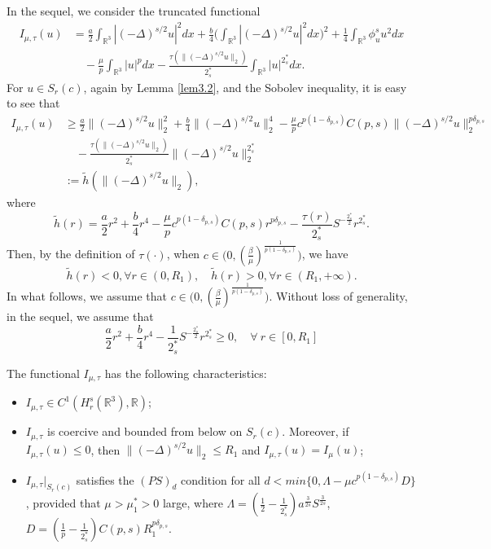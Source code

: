 In the sequel, we consider the truncated functional
\begin{equation}
\begin{split}
I_{\mu,\tau}(u)
&= \frac{a}{2}\int_{\mathbb{R}^3}|(-\Delta)^{s/2}u|^2dx+\frac{b}{4}
 \Big(\int_{\mathbb{R}^3}|(-\Delta)^{s/2}u|^2dx\Big)^2
 +\frac{1}{4}\int_{\mathbb{R}^3}\phi^s_u u^2dx\\
&\quad -\frac{\mu}{p}\int_{\mathbb{R}^3}|u|^pdx
 -\frac{\tau(\|(-\Delta)^{s/2}u\|_2)}{2^*_s}\int_{\mathbb{R}^3}|u|^{2^*_s}dx.
\end{split}
\end{equation}
For $u\in S_{r}(c)$, again by Lemma \ref{lem3.2}, and the Sobolev inequality,
it is easy to see that
\begin{align*}
I_{\mu,\tau}(u)
&\geq  \frac{a}{2}\|(-\Delta)^{s/2}u\|^2_2+\frac{b}{4}\|(-\Delta)^{s/2}u\|^4_2
 -\frac{\mu}{p}c^{p(1-\delta_{p,s})}C({p,s})\|(-\Delta)^{s/2}u\|^{p\delta_{p,s}}_2\\
&\quad -\frac{\tau(\|(-\Delta)^{s/2}u\|_2)}{2^*_s}\|(-\Delta)^{s/2}u\|^{2^*_s}_2\\
&:= \tilde{h}(\|(-\Delta)^{s/2}u\|_2),
\end{align*}
where
$$
\tilde{h}(r)=\frac{a}{2}r^2+\frac{b}{4}r^4
-\frac{\mu}{p}c^{p(1-\delta_{p,s})}C({p,s})r^{p\delta_{p,s}}
-\frac{\tau(r)}{2^*_s}S^{-\frac{2^*_s}{2}}r^{2^*_s}.
$$
Then, by the definition of $\tau(\cdot)$, when
$c\in \big(0, (\frac{\beta}{\mu})^{\frac{1}{p(1-\delta_{p, s})}}\big)$, we have
$$
\tilde{h}(r)<0, \forall r\in(0, R_1),\quad
\tilde{h}(r)>0, \forall r\in(R_1, +\infty).
$$
In what follows, we  assume that
$c\in \big(0, (\frac{\beta}{\mu})^{\frac{1}{p(1-\delta_{p, s})}}\big)$.
Without loss of generality, in the sequel, we  assume that
\begin{equation}\label{1.9}
\frac{a}{2}r^2+\frac{b}{4}r^4-\frac{1}{2^*_s}S^{-\frac{2^*_s}{2}}r^{2^*_s}\geq 0,
\quad \forall ~r\in [0, R_1]
\end{equation}

\begin{lemma}\label{lem2.161}
The functional $I_{\mu,\tau}$ has the following characteristics:
\begin{itemize}
\item[(i)] $I_{\mu,\tau} \in C^1(H^s_{r}(\mathbb{R}^3), \mathbb{R})$;

\item[(ii)] $I_{\mu,\tau}$ is coercive and bounded from below on $S_{r}(c)$.
Moreover, if $I_{\mu,\tau}(u)\leq 0$, then $\|(-\Delta)^{s/2}u\|_2\leq R_1$ and
$I_{\mu,\tau}(u)=I_{\mu}(u)$;

\item[(iii)] $ I_{\mu,\tau}|_{S_{r}(c)}$ satisfies the $(PS)_d$ condition for all
$d<min\{0, \Lambda-\mu c^{p(1-\delta_{p,s})}D\}$, provided that $\mu>\mu^*_1>0$
large, where $\Lambda=(\frac{1}{2}-\frac{1}{2^*_s}) a^{\frac{3}{2s}}S^{\frac{3}{2s}}$,
$D=(\frac{1}{p}-\frac{1}{2^*_s})C(p,s)R_1^{p\delta_{p,s}}$.
\end{itemize}
\end{lemma}

